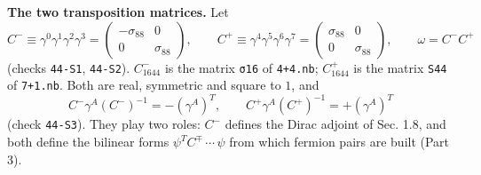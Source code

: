 \documentclass[
  10pt,
]{article}
\begin{document}
\textbf{The two transposition matrices.} Let
\[C^{-}\equiv\gamma^0\gamma^1\gamma^2\gamma^3=\begin{pmatrix}-\sigma_{88}&0\\0&\sigma_{88}\end{pmatrix},\qquad
C^{+}\equiv\gamma^4\gamma^5\gamma^6\gamma^7=\begin{pmatrix}\sigma_{88}&0\\0&\sigma_{88}\end{pmatrix},\qquad
\omega=C^{-}C^{+}\] (checks \texttt{44-S1}, \texttt{44-S2}).
\(C_{1644}^{-}\) is the matrix \texttt{σ16} of \texttt{4+4.nb};
\(C_{1644}^{+}\) is the matrix \texttt{S44} of \texttt{7+1.nb}. Both are
real, symmetric and square to \(1\), and
\[C^{-}\gamma^A(C^{-})^{-1}=-(\gamma^A)^T,\qquad C^{+}\gamma^A(C^{+})^{-1}=+(\gamma^A)^T\tag{1.9}\]
(check \texttt{44-S3}). They play two roles: \(C^{-}\) defines the Dirac
adjoint of Sec. 1.8, and both define the bilinear forms
\(\psi^TC^{\mp}\,\cdots\,\psi\) from which fermion pairs are built (Part
3).
\end{document}
